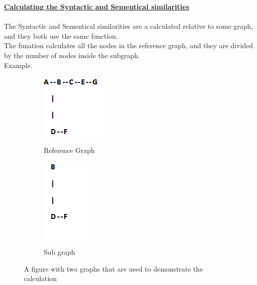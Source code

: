 \break

\textbf{\underline{Calculating the Syntactic and Sementical similarities}}\\\\
The Syntactic and Sementical similarities are a calculated relative to some graph, and they both use the same function.\\
The funation calculates all the nodes in the reference graph, and they are divided by the number of nodes inside the subgraph.\\
Example.
\begin{figure}[H]
\centering
\begin{subfigure}{.5\textwidth}
  \centering
  \includegraphics[width=.4\linewidth]{GraphA.PNG}
  \caption{Reference Graph}
\end{subfigure}%
\begin{subfigure}{.5\textwidth}
  \centering
  \includegraphics[width=.4\linewidth]{GraphB.PNG}
  \caption{Sub graph}
\end{subfigure}
\caption{A figure with two graphs that are used to demonstrate the calculation}
\label{fig:test}
\end{figure}

